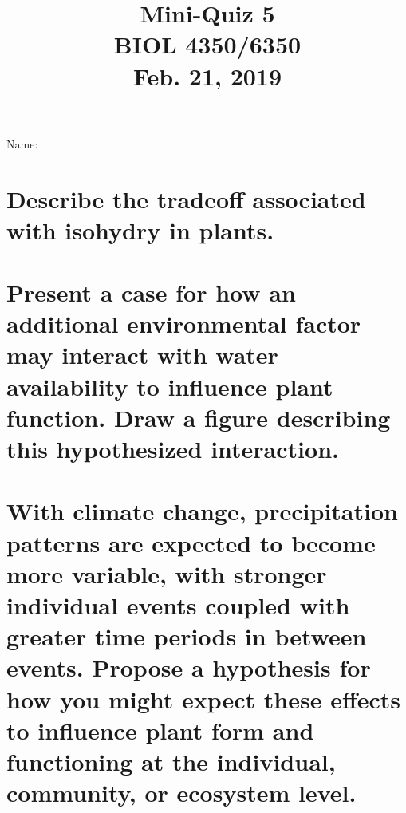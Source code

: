 \documentclass[12pt, notitlepage]{article}   	%
\title{
	\textbf{
		Mini-Quiz 5
	} \\
	\large BIOL 4350/6350 \\
	\large Feb. 21, 2019 \\
}
\date{\vspace{-5ex}}
\def\wl{\par \vspace{\baselineskip}}
\begin{document}
{\selectfont %

\large{Name:}

{\let\newpage\relax\maketitle}

\section{\small{Describe the tradeoff associated with isohydry in plants.}}
\wl
\wl
\wl
\wl
\wl
\wl
\wl
\wl
\wl
\wl

\section{\small{Present a case for how an additional environmental factor may interact 
with water availability to influence plant function. Draw a figure describing this 
hypothesized interaction.}}

\newpage

\section{\small{With climate change, precipitation patterns are expected to become
more variable, with stronger individual events coupled with greater time periods in
between events. Propose a hypothesis for how you might expect these effects to
influence plant form and functioning at the individual, community, or ecosystem
level.}}

} %
\end{document}
